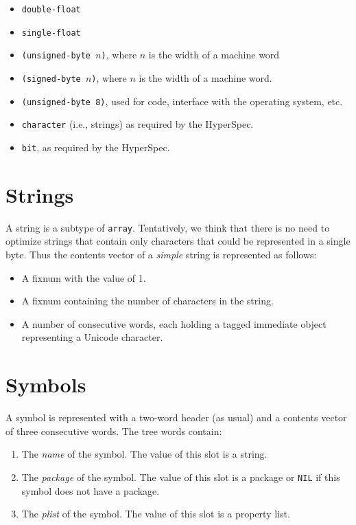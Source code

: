 \begin{itemize}
\item \texttt{double-float}
\item \texttt{single-float}
\item \texttt{(unsigned-byte $n$)}, where $n$ is the width of a
  machine word
\item \texttt{(signed-byte $n$)}, where $n$ is the width of a
  machine word.
\item \texttt{(unsigned-byte 8)}, used for code, interface with the
  operating system, etc. 
\item \texttt{character} (i.e., strings) as required by the HyperSpec.
\item \texttt{bit}, as required by the HyperSpec.
\end{itemize}

\section{Strings}

A string is a subtype of \texttt{array}.  Tentatively, we think that
there is no need to optimize strings that contain only characters that
could be represented in a single byte.  Thus the contents vector of a
\emph{simple} string is represented as follows:

\begin{itemize}
\item A fixnum with the value of 1.
\item A fixnum containing the number of characters in the string.
\item A number of consecutive words, each holding a tagged immediate
  object representing a Unicode character.
\end{itemize}

\section{Symbols}

A symbol is represented with a two-word header (as usual) and a
contents vector of three consecutive words.  The tree words contain:

\begin{enumerate}
\item The \emph{name} of the symbol.  The value of this slot is a
  string.
\item The \emph{package} of the symbol.  The value of this slot is a
  package or \texttt{NIL} if this symbol does not have a package.
\item The \emph{plist} of the symbol.  The value of this slot is a
  property list.
\end{enumerate}

